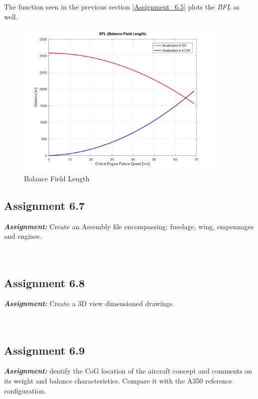 \documentclass{article}
\begin{document}
The function seen in the previous section \ref{Assignment_6.5} plots the \textit{BFL} as well. \\ 

\begin{figure}[h!]
    \centering
    \includegraphics[width=0.9\textwidth]{Sources/Plots_and_Pictures/BFL.png}
    \caption{Balance Field Length}
    \label{BFL}
\end{figure}

\clearpage






\subsection{Assignment 6.7\label{Assignment_6.7}}

\textbf{\textit{Assignment:}} Create an Assembly file encompassing: 
fuselage, wing, empennages and engines. \\ \\ \\ 

\clearpage

\subsection{Assignment 6.8\label{Assignment_6.8}}

\textbf{\textit{Assignment:}} Create a 3D view dimensioned drawings. \\ \\ \\ 

\clearpage

\subsection{Assignment 6.9\label{Assignment_6.9}}

\textbf{\textit{Assignment:}} dentify the CoG location of the aircraft concept and comments
on its weight and balance characteristics. 
Compare it with the A350 reference configuration. \\ \\ \\ 

\clearpage




\pagebreak
\printbibliography
    
\end{document}
